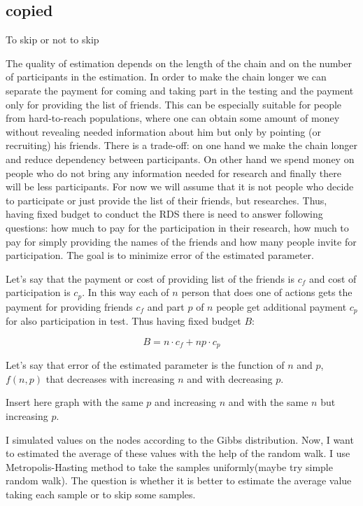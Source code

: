 \documentclass[12pt]{report}
\begin{document}
\subsection{copied}
To skip or not to skip



The quality of estimation depends on the length of the chain and on the number of participants in the estimation.
In order to make the chain longer we can separate the payment for coming and taking part in the testing and the payment only for providing the list of friends.
This can be especially suitable for people from hard-to-reach populations, where one can obtain some amount of money without revealing needed information about him but only by pointing (or recruiting) his friends. There is a trade-off: on one hand we make the chain longer and reduce dependency between participants. On other hand we spend money on people who do not bring any information needed for research and finally there will be less participants. 
For now we will assume that it is not people who decide to participate or just provide the list of their friends, but researches. Thus, having fixed budget to conduct the RDS there is need to answer following questions: how much to pay for the participation in their research, how much to pay for simply providing the names of the friends and how many people invite for participation. The goal is to minimize error of the estimated parameter.

Let's say that the payment or cost of providing list of the friends is $c_f$ and cost of participation is $c_p$. In this way each of $n$ person that does one of actions gets the payment for providing friends $c_f$ and part $p$ of $n$ people get additional payment $c_p$ for also participation in test.
Thus having fixed budget $B$:

$$B = n \cdot c_f + np \cdot c_p$$

Let's say that error of the estimated parameter is the function of $n$ and $p$, $f(n,p)$ that decreases with increasing $n$ and with decreasing $p$.

Insert here graph with the same $p$ and increasing $n$ and with the same $n$ but increasing $p$.

I simulated values on the nodes  according to the Gibbs distribution. Now, I want to estimated the average of these values with the help of the random walk. I use Metropolis-Hasting method to take the samples uniformly(maybe try simple random walk). The question is whether it is better to estimate the average value taking each sample or to skip some samples. 
\end{document}
